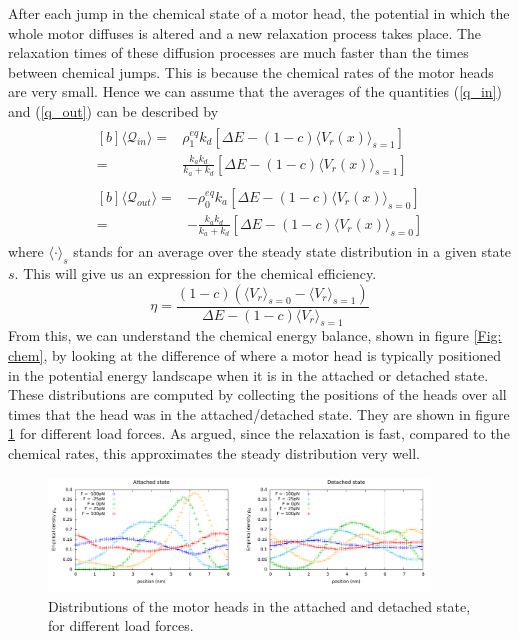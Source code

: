 \documentclass[aps,pre,twocolumn,showpacs,showkeys,a4paper]{revtex4}
\begin{document}
After each jump in the chemical state of a motor head, the potential in which the whole motor diffuses is altered and a new relaxation process takes place. 
The relaxation times of these diffusion processes are much faster than the times between chemical jumps. 
This is because the chemical rates of the motor heads are very small. 
Hence we can assume that the averages of the quantities (\ref{q_in}) and (\ref{q_out}) can be described by
\begin{gather}
\begin{aligned}[b]
\langle \mathcal Q_{in} \rangle 
=& \rho^{eq}_1 k_d \left[ \Delta E - (1-c)\langle V_r(x) \rangle_{s=1} \right] \\
=& \frac{k_a k_d}{k_a + k_d}\left[\Delta E - (1-c)\langle V_r(x) \rangle_{s=1} \right] 
\end{aligned}
\label{Q_in} \\
\begin{aligned}[b]
\langle \mathcal Q_{out} \rangle 
=& -\rho^{eq}_0 k_a \left[ \Delta E - (1-c)\langle V_r(x) \rangle_{s=0} \right] \\
=& -\frac{k_a k_d}{k_a + k_d} \left[ \Delta E - (1-c)\langle V_r(x) \rangle_{s=0} \right] 
\end{aligned}
\label{Q_out}
\end{gather}
where $\langle \cdot \rangle_{s}$ stands for an average over the steady state distribution in a given state $s$. 
This will give us an expression for the chemical efficiency.
\begin{equation}
\eta = \frac{ (1-c) \left( \langle V_r \rangle_{s=0} - \langle V_r \rangle_{s=1} \right) }{ \Delta E - (1-c) \langle V_r \rangle_{s=1} } \label{eta}
\end{equation}
From this, we can understand the chemical energy balance, shown in figure \ref{Fig: chem}, by looking at the difference of where a motor head is typically positioned in the potential energy landscape when it is in the attached or detached state. 
These distributions are computed by collecting the positions of the heads over all times that the head was in the attached/detached state. 
They are shown in figure \ref{Fig: pos_distr} for different load forces. 
As argued, since the relaxation is fast, compared to the chemical rates, this approximates the steady distribution very well.
\begin{figure}[t]
\centering
\includegraphics[width=0.9\textwidth,height=!]{pos_distr_all_F}
\caption{Distributions of the motor heads in the attached and detached state, for different load forces.}
\label{Fig: pos_distr}
\end{figure}
\end{document}
